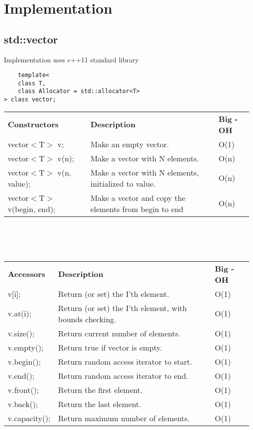 \documentclass[12pt]{article}
\begin{document}
\section[Implementation]{Implementation}
\subsection{std::vector}
Implementation uses c++11 standard library
\begin{lstlisting}
	template<
    class T,
    class Allocator = std::allocator<T>
> class vector;
\end{lstlisting}
\begin{tabular}{ l l l }
\textbf{Constructors} & \textbf{Description} & \textbf{Big - OH}\\
vector$<$T$>$ v; & Make an empty vector. & O(1)\\
vector$<$T$>$ v(n); & Make a vector with N elements. & O(n)\\
vector$<$T$>$ v(n, value); & Make a vector with N elements, initialized to value. & O(n)\\
vector$<$T$>$ v(begin, end); & Make a vector and copy the elements from begin to end & O(n)\\
\end{tabular}
\\
\\
\\
\begin{tabular}{ l l l }
\textbf{Accessors} & \textbf{Description} & \textbf{Big - OH}\\
v[i]; & Return (or set) the I'th element. & O(1)\\
v.at(i); & Return (or set) the I'th element, with bounds checking. & O(1)\\
v.size(); & Return current number of elements. & O(1)\\
v.empty(); & Return true if vector is empty. & O(1)\\
v.begin(); & Return random access iterator to start. & O(1)\\
v.end(); & Return random access iterator to end. & O(1)\\
v.front(); & Return the first element. & O(1)\\
v.back(); & Return the last element. & O(1)\\
v.capacity(); & Return maximum number of elements. & O(1)\\
\end{tabular}
\\
\\
\end{document}
